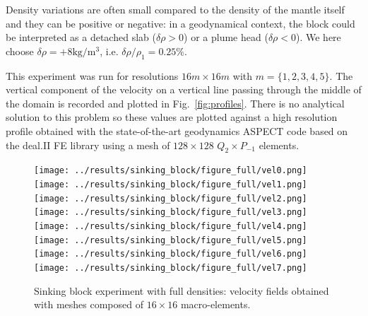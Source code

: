 \documentclass[a4paper]{article}
\begin{document}
Density variations are often small compared to the density of the mantle itself
and they can be positive or negative: in a geodynamical context, 
the block could be interpreted as a detached slab
($\delta\rho>0$) or a plume head ($\delta\rho<0$). 
We here choose $\delta \rho=+8\si{\kg\per\cubic\metre}$, i.e. $\delta \rho/\rho_1 = 0.25\%$.

This experiment was run for resolutions $16m\times 16m$ with $m=\{1,2,3,4,5\}$. 
The vertical component of the velocity on a vertical line passing through the middle
of the domain is recorded and plotted in Fig.~\ref{fig:profiles}. 
There is no analytical solution to this problem so 
these values are plotted against a high resolution profile obtained with the state-of-the-art geodynamics ASPECT 
code\cite{krhb12,hedg17} based on the deal.II FE library \cite{XX} 
using a mesh of $128\times128$ $Q_2\times P_{-1}$ elements.


\begin{figure}[t]
\centering
\texttt{[image: ../results/sinking\_block/figure\_full/vel0.png]}
\texttt{[image: ../results/sinking\_block/figure\_full/vel1.png]}
\texttt{[image: ../results/sinking\_block/figure\_full/vel2.png]}
\texttt{[image: ../results/sinking\_block/figure\_full/vel3.png]}\\
\texttt{[image: ../results/sinking\_block/figure\_full/vel4.png]}
\texttt{[image: ../results/sinking\_block/figure\_full/vel5.png]}
\texttt{[image: ../results/sinking\_block/figure\_full/vel6.png]}
\texttt{[image: ../results/sinking\_block/figure\_full/vel7.png]}
\caption{Sinking block experiment with full densities: velocity fields 
obtained with meshes composed of $16\times 16$ macro-elements. \label{fig:dh1}}
\end{figure}
\end{document}
